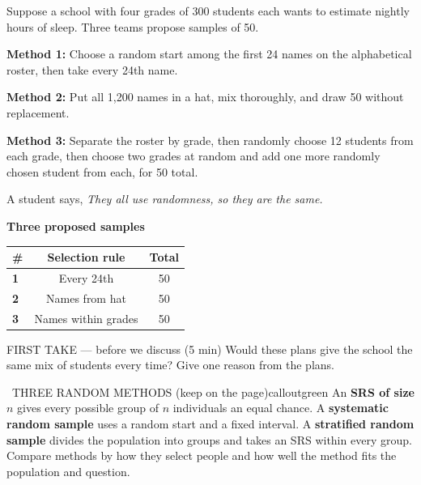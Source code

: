 \documentclass[11pt]{article}
\begin{document}


Suppose a school with four grades of 300 students each wants to estimate nightly hours of sleep. Three teams propose samples of 50.\par\smallskip \textbf{Method 1:} Choose a random start among the first 24 names on the alphabetical roster, then take every 24th name.\par \textbf{Method 2:} Put all 1{,}200 names in a hat, mix thoroughly, and draw 50 without replacement.\par \textbf{Method 3:} Separate the roster by grade, then randomly choose 12 students from each grade, then choose two grades at random and add one more randomly chosen student from each, for 50 total.\par\smallskip A student says, \emph{They all use randomness, so they are the same.}\par
\begin{center}
\textbf{Three proposed samples}\par\smallskip
\begin{tabular}{|l|c|c|}
\hline
\textbf{\#} & \textbf{Selection rule} & \textbf{Total} \\ \hline
\textbf{1} & Every 24th & 50 \\ \hline
\textbf{2} & Names from hat & 50 \\ \hline
\textbf{3} & Names within grades & 50 \\ \hline
\end{tabular}
\end{center}
\begin{firsttakebox}{FIRST TAKE --- before we discuss (5 min)}
Would these plans give the school the same mix of students every time? Give one reason from the plans.
\workspace{0.9in}
\end{firsttakebox}

\begin{callout}{\IconBook\ THREE RANDOM METHODS (keep on the page)}{calloutgreen}
An \textbf{SRS of size $n$} gives every possible group of $n$ individuals an equal chance. A \textbf{systematic random sample} uses a random start and a fixed interval. A \textbf{stratified random sample} divides the population into groups and takes an SRS within every group. Compare methods by how they select people and how well the method fits the population and question.
\end{callout}
\end{document}
